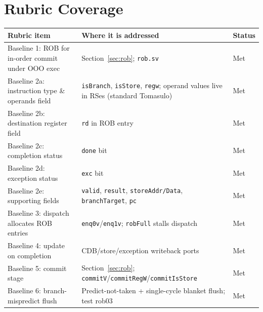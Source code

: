 \documentclass[11pt]{article}
\begin{document}
\section{Rubric Coverage}

\begin{table}[h]
  \centering
  \small
  \begin{tabular}{p{4.5cm} p{9.5cm} l}
    \toprule
    \textbf{Rubric item}                               & \textbf{Where it is addressed}                                                                      & \textbf{Status} \\
    \midrule
    Baseline 1: ROB for in-order commit under OOO exec & Section~\ref{sec:rob}; \texttt{rob.sv}                                                              & Met             \\
    Baseline 2a: instruction type \& operands field    & \texttt{isBranch}, \texttt{isStore}, \texttt{regw}; operand values live in RSes (standard Tomasulo) & Met             \\
    Baseline 2b: destination register field            & \texttt{rd} in ROB entry                                                                            & Met             \\
    Baseline 2c: completion status                     & \texttt{done} bit                                                                                   & Met             \\
    Baseline 2d: exception status                      & \texttt{exc} bit                                                                                    & Met             \\
    Baseline 2e: supporting fields                     & \texttt{valid}, \texttt{result}, \texttt{storeAddr/Data}, \texttt{branchTarget}, \texttt{pc}        & Met             \\
    Baseline 3: dispatch allocates ROB entries         & \texttt{enq0v}/\texttt{enq1v}; \texttt{robFull} stalls dispatch                                     & Met             \\
    Baseline 4: update on completion                   & CDB/store/exception writeback ports                                                                 & Met             \\
    Baseline 5: commit stage                           & Section~\ref{sec:rob}; \texttt{commitV}/\texttt{commitRegW}/\texttt{commitIsStore}                  & Met             \\
    Baseline 6: branch-mispredict flush                & Predict-not-taken + single-cycle blanket flush; test rob03                                          & Met             \\

\end{tabular}
\end{table}
\end{document}
